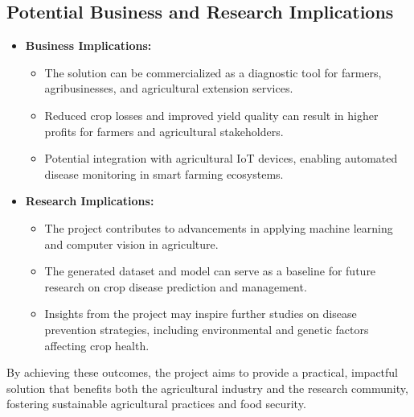 \subsection{Potential Business and Research Implications}
\begin{itemize}
    \item \textbf{Business Implications:}
    \begin{itemize}
        \item The solution can be commercialized as a diagnostic tool for farmers, agribusinesses, and agricultural extension services.
        \item Reduced crop losses and improved yield quality can result in higher profits for farmers and agricultural stakeholders.
        \item Potential integration with agricultural IoT devices, enabling automated disease monitoring in smart farming ecosystems.
    \end{itemize}
    
    \item \textbf{Research Implications:}
    \begin{itemize}
        \item The project contributes to advancements in applying machine learning and computer vision in agriculture.
        \item The generated dataset and model can serve as a baseline for future research on crop disease prediction and management.
        \item Insights from the project may inspire further studies on disease prevention strategies, including environmental and genetic factors affecting crop health.
    \end{itemize}
\end{itemize}

By achieving these outcomes, the project aims to provide a practical, impactful solution that benefits both the agricultural industry and the research community, fostering sustainable agricultural practices and food security.
